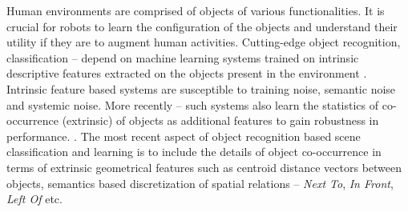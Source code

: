 \documentclass[letterpaper, 10 pt, conference]{ieeeconf}  %
\begin{document}
Human environments are comprised of objects of various functionalities. It is crucial for 
robots to learn the configuration of the objects and understand their utility if they are 
to augment human activities. Cutting-edge object recognition, classification -- depend on 
machine learning systems trained on intrinsic descriptive features extracted on the 
objects present in the environment \cite{INCLUDE CITATION = refer to AAAI paper}. 
Intrinsic feature based systems are susceptible to training noise, semantic noise and 
systemic noise. More recently -- such systems also learn the statistics of co-occurrence 
(extrinsic) of objects as additional features to gain robustness in performance.
\cite{INCLUDE CITATION = AAAI paper}. The most recent aspect of object recognition based 
scene classification and learning is to include the details of object co-occurrence in 
terms of extrinsic geometrical features such as centroid distance vectors between 
objects\cite{INCLUDE CITATION = Marina}, semantics based discretization of spatial 
relations -- \textit{Next To}, \textit{In Front}, \textit{Left Of} etc. \cite{INCLUDE CITATION = relevant papers recently found}

\end{document}
